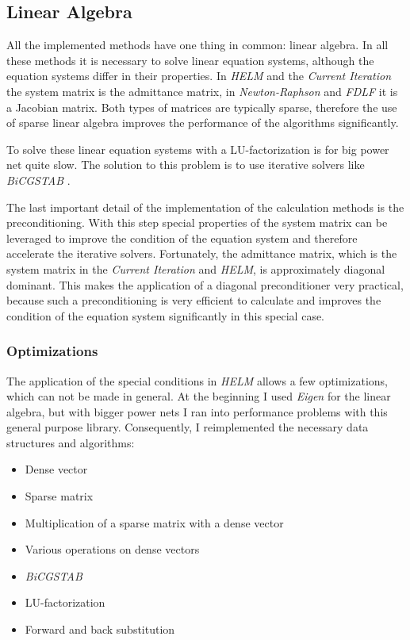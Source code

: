 \subsection{Linear Algebra}
All the implemented methods have one thing in common: linear algebra. In all these methods it is necessary to solve linear equation systems, although the equation systems differ in their properties. In \emph{HELM} and the \emph{Current Iteration} the system matrix is the admittance matrix, in \emph{Newton-Raphson} and \emph{FDLF} it is a Jacobian matrix. Both types of matrices are typically sparse, therefore the use of sparse linear algebra improves the performance of the algorithms significantly.

To solve these linear equation systems with a LU-factorization is for big power net quite slow. The solution to this problem is to use iterative solvers like \emph{BiCGSTAB} \cite{bicgstab}.

The last important detail of the implementation of the calculation methods is the preconditioning. With this step special properties of the system matrix can be leveraged to improve the condition of the equation system and therefore accelerate the iterative solvers. Fortunately, the admittance matrix, which is the system matrix in the \emph{Current Iteration} and \emph{HELM}, is approximately diagonal dominant. This makes the application of a diagonal preconditioner very practical, because such a preconditioning is very efficient to calculate and improves the condition of the equation system significantly in this special case.

\subsubsection{Optimizations}
The application of the special conditions in \emph{HELM} allows a few optimizations, which can not be made in general. At the beginning I used \emph{Eigen} for the linear algebra, but with bigger power nets I ran into performance problems with this general purpose library. Consequently, I reimplemented the necessary data structures and algorithms:
\begin{itemize}
	\item Dense vector
	\item Sparse matrix
	\item Multiplication of a sparse matrix with a dense vector
	\item Various operations on dense vectors
	\item \emph{BiCGSTAB}
	\item LU-factorization
	\item Forward and back substitution
\end{itemize}

